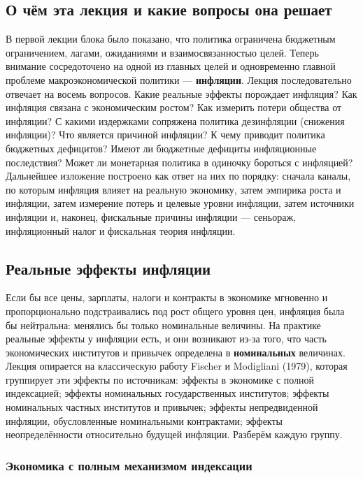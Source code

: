 \documentclass[11pt,a4paper]{article}
\begin{document}
\subsection{О чём эта лекция и какие вопросы она решает}

В первой лекции блока было показано, что политика ограничена бюджетным ограничением, лагами, ожиданиями и взаимосвязанностью целей. Теперь внимание сосредоточено на одной из главных целей и одновременно главной проблеме макроэкономической политики --- \textbf{инфляции}. Лекция последовательно отвечает на восемь вопросов. Какие реальные эффекты порождает инфляция? Как инфляция связана с экономическим ростом? Как измерить потери общества от инфляции? С какими издержками сопряжена политика дезинфляции (снижения инфляции)? Что является причиной инфляции? К чему приводит политика бюджетных дефицитов? Имеют ли бюджетные дефициты инфляционные последствия? Может ли монетарная политика в одиночку бороться с инфляцией? Дальнейшее изложение построено как ответ на них по порядку: сначала каналы, по которым инфляция влияет на реальную экономику, затем эмпирика роста и инфляции, затем измерение потерь и целевые уровни инфляции, затем источники инфляции и, наконец, фискальные причины инфляции --- сеньораж, инфляционный налог и фискальная теория инфляции.

\subsection{Реальные эффекты инфляции}

Если бы все цены, зарплаты, налоги и контракты в экономике мгновенно и пропорционально подстраивались под рост общего уровня цен, инфляция была бы нейтральна: менялись бы только номинальные величины. На практике реальные эффекты у инфляции есть, и они возникают из-за того, что часть экономических институтов и привычек определена в \textbf{номинальных} величинах. Лекция опирается на классическую работу Fischer и Modigliani (1979), которая группирует эти эффекты по источникам: эффекты в экономике с полной индексацией; эффекты номинальных государственных институтов; эффекты номинальных частных институтов и привычек; эффекты непредвиденной инфляции, обусловленные номинальными контрактами; эффекты неопределённости относительно будущей инфляции. Разберём каждую группу.

\subsubsection{Экономика с полным механизмом индексации}
\end{document}
